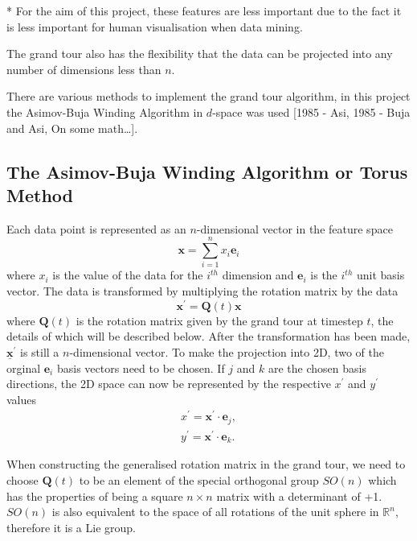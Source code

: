 \documentclass[a4paper,11pt,twoside]{article}
\begin{document}
* For the aim of this project, these features are less important due to the fact it is less important for human visualisation when data mining.
\newline

The grand tour also has the flexibility that the data can be projected into any number of dimensions less than $n$.
\newline

There are various methods to implement the grand tour algorithm, in this project the Asimov-Buja Winding Algorithm in $d$-space was used [1985 - Asi, 1985 - Buja and Asi, On some math…]. 

\subsection{The Asimov-Buja Winding Algorithm or Torus Method}

Each data point is represented as an $n$-dimensional vector in the feature space
\begin{equation}
\bm{x}=\sum_{i=1}^n x_i \bm{e}_i 
\end{equation}
where $x_i$ is the value of the data for the $i^{th}$ dimension and $\bm{e}_i$ is the $i^{th}$ unit basis vector. The data is transformed by multiplying the rotation matrix by the data
\begin{equation}
\bm{x}^\prime = \bm{Q}(t) \bm{x}
\end{equation}
where $\bm{Q}(t)$ is the rotation matrix given by the grand tour at timestep $t$, the details of which will be described below. After the transformation has been made, $\bm{\underline{x}}^\prime$ is still a $n$-dimensional vector. To make the projection into 2D, two of the orginal $\bm{e}_i$ basis vectors need to be chosen. If $j$ and $k$ are the chosen basis directions, the 2D space can now be represented by the respective $x^{\prime}$ and $y^{\prime}$ values
\begin{equation}
\begin{split}
x^{\prime}=\bm{x}^\prime\cdot\bm{e}_j, 
\\
y^{\prime}=\bm{x}^\prime\cdot\bm{e}_k.
\end{split}
\end{equation}

When constructing the generalised rotation matrix in the grand tour, we need to choose $\bm{Q}(t)$ to be an element of the special orthogonal group $SO(n)$ which has the properties of being a square $n\times n$ matrix with a determinant of +1. $SO(n)$ is also equivalent to the space of all rotations of the unit sphere in $\mathbb{R}^n$, therefore it is a Lie group.
\newline
\end{document}
